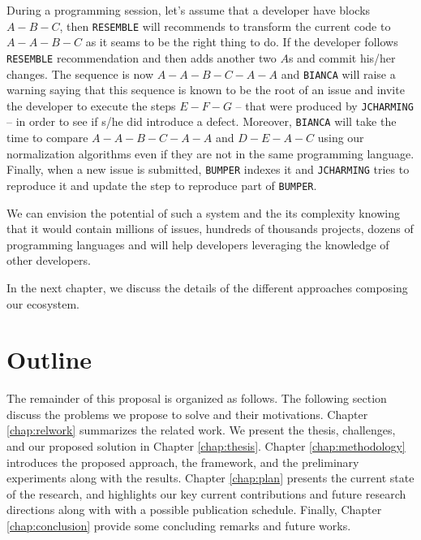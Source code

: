 During a programming session, let's assume that a developer have blocks $A-B-C$, then {\tt RESEMBLE} will recommends to transform the current code to $A-A-B-C$ as it seams to be the right thing to do.
If the developer follows {\tt RESEMBLE} recommendation and then adds another two $A$s and commit his/her changes.
The sequence is now $A-A-B-C-A-A$ and {\tt BIANCA} will raise a warning saying that this sequence is known to be the root of an issue and invite the developer to execute the steps $E-F-G$ -- that were produced by {\tt JCHARMING} -- in order to see if s/he did introduce a defect. Moreover, {\tt BIANCA} will take the time to compare $A-A-B-C-A-A$ and $D-E-A-C$ using our normalization algorithms even if they are not in the same programming language.
Finally, when a new issue is submitted, {\tt BUMPER} indexes it and {\tt JCHARMING} tries to reproduce it and update the step to reproduce part of {\tt BUMPER}.

We can envision the potential of such a system and the its complexity knowing that it would contain millions of issues, hundreds of thousands projects, dozens of programming languages and will help developers leveraging the knowledge of other developers.

In the next chapter, we discuss the details of the different approaches composing our ecosystem.

\section{Outline\label{sec:outline}}

The remainder of this proposal is organized as follows. The following section discuss the problems we propose to solve and their motivations. Chapter \ref{chap:relwork} summarizes the related work.
We present the thesis, challenges, and our proposed solution in Chapter \ref{chap:thesis}.
Chapter \ref{chap:methodology} introduces the proposed approach, the framework, and the preliminary experiments along with the results.
Chapter \ref{chap:plan} presents the current state of the research, and highlights our key current contributions and future research directions along with with a possible publication schedule.
Finally, Chapter \ref{chap:conclusion} provide some concluding remarks and future works.
